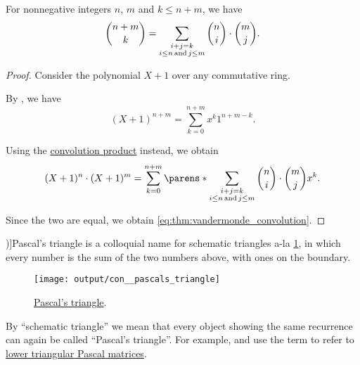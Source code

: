 \begin{theorem}\label{thm:vandermonde_convolution}
  For nonnegative integers \( n \), \( m \) and \( k \leq n + m \), we have
  \begin{equation}\label{eq:thm:vandermonde_convolution}
    \binom {n + m} k = \sum_{\substack{i+j=k \\ i \leq n \T*{and} j \leq m}} \binom n i \cdot \binom m j.
  \end{equation}
\end{theorem}
\begin{proof}
  Consider the polynomial \( X + 1 \) over any commutative ring.

  By , we have
  \begin{equation*}
    (X + 1)^{n+m} = \sum_{k=0}^{n+m} x^k 1^{n+m-k}.
  \end{equation*}

  Using the \hyperref[def:semigroup_algebra]{convolution product} instead, we obtain
  \begin{equation*}
    (X + 1)^n \cdot (X + 1)^m = \sum_{k=0}^{n+m} \parens*{ \sum_{\substack{i+j=k \\ i \leq n \T*{and} j \leq m}} \binom n i \cdot \binom m j } x^k.
  \end{equation*}

  Since the two are equal, we obtain \eqref{eq:thm:vandermonde_convolution}.
\end{proof}

\begin{concept}\label{con:pascals_triangle}
  \term[ru=треугольник Паскаля (\cite[\S 5.3.4]{Новиков2013ДискретнаяМатематика})]{Pascal's triangle} is a colloquial name for schematic triangles a-la \cref{fig:con:pascals_triangle}, in which every number is the sum of the two numbers above, with ones on the boundary.

  \begin{figure}[!ht]
    \centering
    \texttt{[image: output/con\_\_pascals\_triangle]}
    \caption{\hyperref[con:pascals_triangle]{Pascal's triangle}.}\label{fig:con:pascals_triangle}
  \end{figure}

  By \enquote{schematic triangle} we mean that every object showing the same recurrence can again be called \enquote{Pascal's triangle}. For example,  and  use the term to refer to \hyperref[def:pascal_matrix/lower]{lower triangular Pascal matrices}.
\end{concept}

